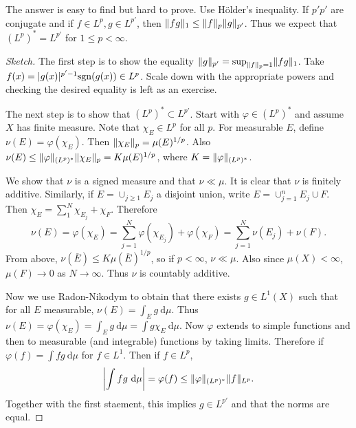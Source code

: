 \documentclass[10pt, twoside]{article}
\renewcommand{\d}{\ \mathrm{d}}
\begin{document}
    \begin{exm}[Dual of $L^p(X, \mu)$] The answer is easy to find but hard to
        prove. Use H\"older's inequality. If $p'p'$ are conjugate and if $f \in
        L^p, g \in L^{p'}$, then $\lVert fg\rVert_1 \leq \lVert f\rVert_p \lVert g\rVert_{p'}$.
        Thus we expect that $(L^p)^* = L^{p'}$ for $1 \leq p < \infty$.

        \begin{proof}[Sketch] The first step is to show the equality
            $\lVert g\rVert_{p'} = \sup_{\lVert f\rVert_p = 1} \lVert fg\rVert_1$. Take $f(x) =
            \lvert g(x)\rvert^{p'-1} \mathrm{sgn}(g(x)) \in L^p$. Scale down with the
            appropriate powers and checking the desired equality is left as an
            exercise.
            
            The next step is to show that $(L^p)^* \subset L^{p'}$. Start with
            $\varphi \in (L^p)^*$ and assume $X$ has finite measure. Note that
            $\chi_E \in L^p$ for all $p$. For measurable $E$, define $\nu(E) =
            \varphi(\chi_E)$. Then $\lVert\chi_E\rVert_p = \mu(E)^{1/p}$. Also
            $\nu(E) \leq \lVert\varphi\rVert_{(L^p)^*} \lVert\chi_E\rVert_p = K
            \mu(E)^{1/p}$, where $K = \lVert\varphi\rVert_{(L^p)^*}$.
            
            We show that $\nu$ is a signed measure and that $\nu \ll \mu$. It
            is clear that $\nu$ is finitely additive. Similarly, if $E =
            \cup_{j \geq 1} E_j$ a disjoint union, write $E = \cup_{j=1}^n E_j
            \cup F$. Then $\chi_E = \sum_{1}^N \chi_{E_j} + \chi_F$. Therefore
            \[ \nu(E) = \varphi(\chi_E) = \sum_{j=1}^N \varphi(\chi_{E_j}) +
            \varphi(\chi_F) = \sum_{j=1}^N \nu(E_j) + \nu(F).\] From above,
            $\nu(\overline{E}) \leq K \mu(\overline{E})^{1/p}$, so if $p <
            \infty$, $\nu \ll \mu$. Also since $\mu(X) < \infty$, $\mu(F) \to
            0$ as $N \to \infty$. Thus $\nu$ is countably additive.

            Now we use Radon-Nikodym to obtain that there exists $g \in L^1(X)$
            such that for all $E$ measurable, $\nu(E) = \int_E g \d\mu$. Thus
            $\nu(E) = \varphi(\chi_E) = \int_E g \d\mu = \int g \chi_E \d\mu$.
            Now $\varphi$ extends to simple functions and then to measurable
            (and integrable) functions by taking limits. Therefore if
            $\varphi(f) = \int fg \d\mu$ for $f \in L^1$. Then if $f \in L^p$,
            \[\abs*{\int fg \d \mu} = \varphi(f) \leq \norm{\varphi}_{(L^p)^*}
            \norm{f}_{L^p}. \] Together with the first staement, this implies
        $g \in L^{p'}$ and that the norms are equal.  \end{proof} \end{exm}
\end{document}
